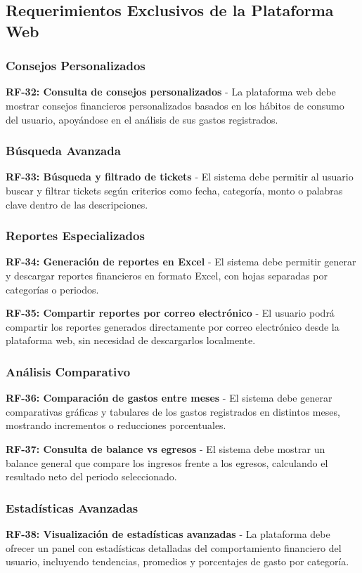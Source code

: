 \subsection{Requerimientos Exclusivos de la Plataforma Web}

\subsubsection{Consejos Personalizados}
\textbf{RF-32: Consulta de consejos personalizados} - La plataforma web debe mostrar consejos financieros personalizados basados en los hábitos de consumo del usuario, apoyándose en el análisis de sus gastos registrados.

\subsubsection{Búsqueda Avanzada}
\textbf{RF-33: Búsqueda y filtrado de tickets} - El sistema debe permitir al usuario buscar y filtrar tickets según criterios como fecha, categoría, monto o palabras clave dentro de las descripciones.

\subsubsection{Reportes Especializados}
\textbf{RF-34: Generación de reportes en Excel} - El sistema debe permitir generar y descargar reportes financieros en formato Excel, con hojas separadas por categorías o periodos.

\textbf{RF-35: Compartir reportes por correo electrónico} - El usuario podrá compartir los reportes generados directamente por correo electrónico desde la plataforma web, sin necesidad de descargarlos localmente.

\subsubsection{Análisis Comparativo}
\textbf{RF-36: Comparación de gastos entre meses} - El sistema debe generar comparativas gráficas y tabulares de los gastos registrados en distintos meses, mostrando incrementos o reducciones porcentuales.

\textbf{RF-37: Consulta de balance vs egresos} - El sistema debe mostrar un balance general que compare los ingresos frente a los egresos, calculando el resultado neto del periodo seleccionado.

\subsubsection{Estadísticas Avanzadas}
\textbf{RF-38: Visualización de estadísticas avanzadas} - La plataforma debe ofrecer un panel con estadísticas detalladas del comportamiento financiero del usuario, incluyendo tendencias, promedios y porcentajes de gasto por categoría.

